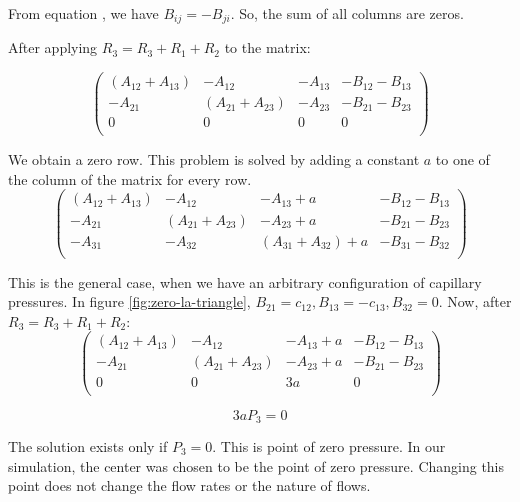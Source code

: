 	From equation \label{eq:symmetry-of-b}, we have $B_{ij} = -B_{ji}$. So, the sum of all columns are zeros.
		
	After applying $R_3 = R_3 + R_1 + R_2$ to the matrix:
	
	\begin{equation}
		\begin{pmatrix}
			(A_{12} + A_{13}) & -A_{12} & -A_{13} & -B_{12} - B_{13} \\
			-A_{21} & (A_{21} + A_{23}) & -A_{23} & -B_{21} - B_{23} \\
			0 & 0 & 0 & 0 \\
		\end{pmatrix}
	\end{equation}
	
	We obtain a zero row. This problem is solved by adding a constant $a$ to one of the column of the matrix for every row. 
	\begin{equation}
		\begin{pmatrix}
			(A_{12} + A_{13}) & -A_{12} & -A_{13} + a & -B_{12} - B_{13} \\
			-A_{21} & (A_{21} + A_{23}) & -A_{23} + a & -B_{21} - B_{23} \\
			-A_{31} & -A_{32} & (A_{31} + A_{32}) + a & -B_{31} - B_{32} \\
		\end{pmatrix}
	\end{equation}
	
	This is the general case, when we have an arbitrary configuration of capillary pressures. In figure \ref{fig:zero-la-triangle}, $B_{21} = c_{12}, B_{13} = -c_{13}, B_{32} = 0$. Now, after $R_3 = R_3 + R_1 + R_2$:
	\begin{equation}
		\begin{pmatrix}
			(A_{12} + A_{13}) & -A_{12} & -A_{13} + a & -B_{12} - B_{13} \\
			-A_{21} & (A_{21} + A_{23}) & -A_{23} + a & -B_{21} - B_{23} \\
			0 & 0 & 3a & 0 \\
		\end{pmatrix}
	\end{equation}
	
	\begin{equation}
		3aP_3 = 0
	\end{equation}
	
	The solution exists only if $P_3 = 0$. This is point of zero pressure. In our simulation, the center was chosen to be the point of zero pressure. Changing this point does not change the flow rates or the nature of flows.

